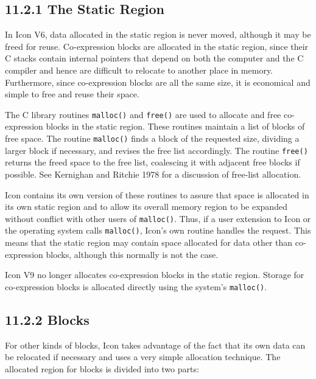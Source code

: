 \subsection[11.2.1 The Static Region]{11.2.1 The Static Region}

In Icon V6, data allocated in the static region is never moved, although it may be
freed for reuse. Co-expression blocks are allocated in the static
region, since their C stacks contain internal pointers that depend on
both the computer and the C compiler and hence are difficult to
relocate to another place in memory. Furthermore, since co-expression
blocks are all the same size, it is economical and simple to free and
reuse their space.

The C library routines \texttt{malloc()} and \texttt{free()} are used
to allocate and free co-expression blocks in the static region. These
routines maintain a list of blocks of free space. The routine
\texttt{malloc()} finds a block of the requested size, dividing a
larger block if necessary, and revises the free list accordingly. The
routine \texttt{free()} returns the freed space to the free list,
coalescing it with adjacent free blocks if possible. See Kernighan and
Ritchie 1978 for a discussion of free-list allocation.

Icon contains its own version of these routines to assure that space
is allocated in its own static region and to allow its overall memory
region to be expanded without conflict with other users of
\texttt{malloc()}. Thus, if a user extension to Icon or the operating
system calls \texttt{malloc()}, Icon's own routine handles the
request. This means that the static region may contain space allocated
for data other than co-expression blocks, although this normally is
not the case.

Icon V9 no longer allocates co-expression blocks in the static
region. Storage for co-expression blocks is allocated
directly using the system's \texttt{malloc()}.

\subsection[11.2.2 Blocks]{11.2.2 Blocks}

For other kinds of blocks, Icon takes advantage of the fact that its
own data can be relocated if necessary and uses a very simple
allocation technique. The allocated region for blocks is divided into
two parts:

